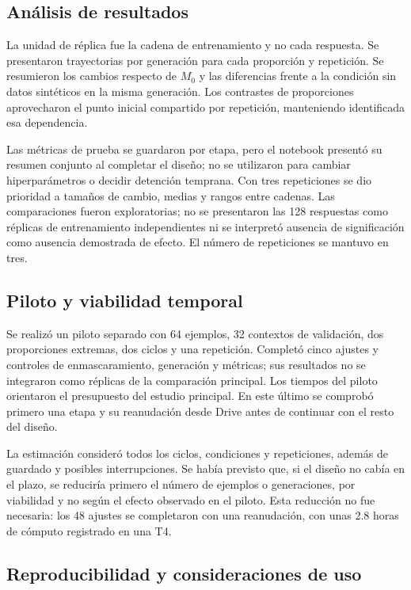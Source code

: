 \documentclass[12pt,letterpaper]{article}
\begin{document}
\subsection{Análisis de resultados}

La unidad de réplica fue la cadena de entrenamiento y no cada respuesta.
Se presentaron trayectorias por generación para cada proporción y
repetición. Se resumieron los cambios respecto de \(M_0\) y las diferencias
frente a la condición sin datos sintéticos en la misma generación.
Los contrastes de proporciones aprovecharon el punto inicial compartido
por repetición, manteniendo identificada esa dependencia.

Las métricas de prueba se guardaron por etapa, pero el notebook presentó
su resumen conjunto al completar el diseño; no se utilizaron para cambiar
hiperparámetros o decidir detención temprana. Con tres repeticiones se dio
prioridad a tamaños de cambio, medias y
rangos entre cadenas. Las comparaciones fueron exploratorias; no se
presentaron las 128 respuestas como réplicas de entrenamiento independientes
ni se interpretó ausencia de significación como ausencia demostrada
de efecto. El número de repeticiones se mantuvo en tres.

\subsection{Piloto y viabilidad temporal}

Se realizó un piloto separado con 64 ejemplos, 32 contextos de validación,
dos proporciones extremas, dos ciclos y una repetición. Completó cinco
ajustes y controles de enmascaramiento, generación y métricas; sus
resultados no se integraron como réplicas de la comparación principal.
Los tiempos del piloto orientaron el presupuesto
del estudio principal. En este último se comprobó primero una etapa y su
reanudación desde Drive antes de continuar con el resto del diseño.

La estimación consideró todos los ciclos, condiciones y repeticiones,
además de guardado y posibles interrupciones. Se había previsto que, si el
diseño no cabía en el plazo, se reduciría primero el número de ejemplos o
generaciones, por viabilidad y no según el efecto observado en el piloto.
Esta reducción no fue necesaria: los 48 ajustes se completaron con una reanudación, con unas 2.8 horas de cómputo registrado en una T4.

\subsection{Reproducibilidad y consideraciones de uso}
\end{document}
